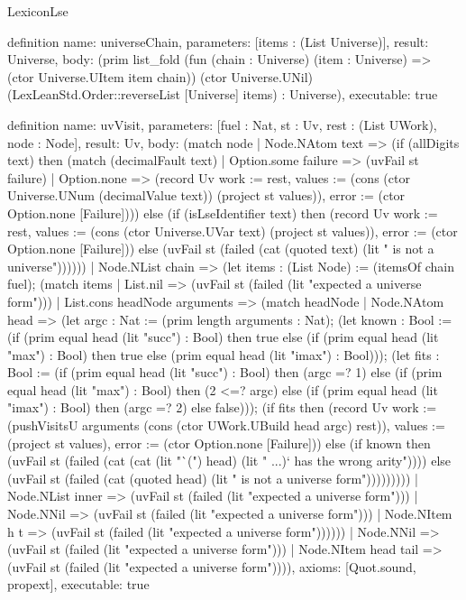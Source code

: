 \begin{lexlean}{LexiconLse}
\begin{semanticmodule}
definition{
  name: universeChain,
  parameters: [items : (List Universe)],
  result: Universe,
  body: (prim list_fold (fun (chain : Universe) (item : Universe) => (ctor Universe.UItem item chain)) (ctor Universe.UNil) (LexLeanStd.Order::reverseList [Universe] items) : Universe),
  executable: true
}

definition{
  name: uvVisit,
  parameters: [fuel : Nat, st : Uv, rest : (List UWork), node : Node],
  result: Uv,
  body: (match node
    | Node.NAtom text => (if (allDigits text) then (match (decimalFault text)
      | Option.some failure => (uvFail st failure)
      | Option.none => (record Uv {work := rest, values := (cons (ctor Universe.UNum (decimalValue text)) (project st values)), error := (ctor Option.none [Failure])})) else (if (isLseIdentifier text) then (record Uv {work := rest, values := (cons (ctor Universe.UVar text) (project st values)), error := (ctor Option.none [Failure])}) else (uvFail st (failed (cat (quoted text) (lit " is not a universe"))))))
    | Node.NList chain => (let items : (List Node) := (itemsOf chain fuel); (match items
      | List.nil => (uvFail st (failed (lit "expected a universe form")))
      | List.cons headNode arguments => (match headNode
        | Node.NAtom head => (let argc : Nat := (prim length arguments : Nat); (let known : Bool := (if (prim equal head (lit "succ") : Bool) then true else (if (prim equal head (lit "max") : Bool) then true else (prim equal head (lit "imax") : Bool))); (let fits : Bool := (if (prim equal head (lit "succ") : Bool) then (argc =? 1) else (if (prim equal head (lit "max") : Bool) then (2 <=? argc) else (if (prim equal head (lit "imax") : Bool) then (argc =? 2) else false))); (if fits then (record Uv {work := (pushVisitsU arguments (cons (ctor UWork.UBuild head argc) rest)), values := (project st values), error := (ctor Option.none [Failure])}) else (if known then (uvFail st (failed (cat (cat (lit "`(") head) (lit " ...)` has the wrong arity")))) else (uvFail st (failed (cat (quoted head) (lit " is not a universe form")))))))))
        | Node.NList inner => (uvFail st (failed (lit "expected a universe form")))
        | Node.NNil => (uvFail st (failed (lit "expected a universe form")))
        | Node.NItem h t => (uvFail st (failed (lit "expected a universe form"))))))
    | Node.NNil => (uvFail st (failed (lit "expected a universe form")))
    | Node.NItem head tail => (uvFail st (failed (lit "expected a universe form")))),
  axioms: [Quot.sound, propext],
  executable: true
}


\end{semanticmodule}
\end{lexlean}

